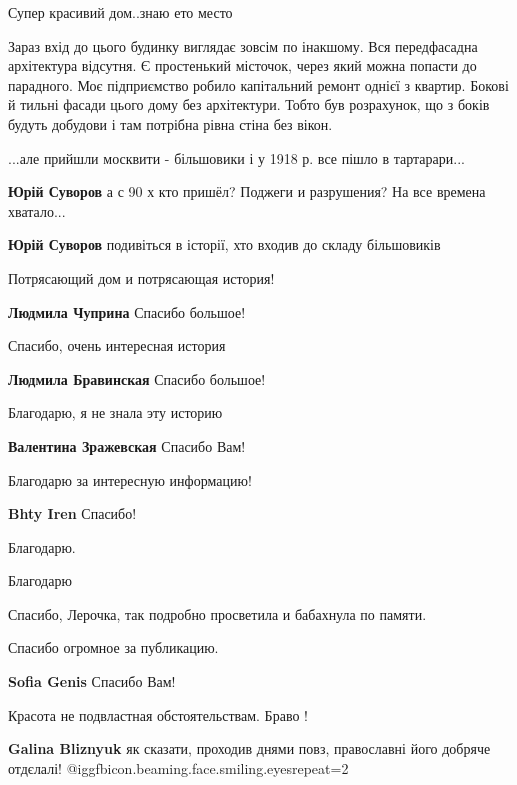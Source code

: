 \begin{itemize}
Супер красивий дом..знаю ето место


Зараз вхід до цього будинку виглядає зовсім по інакшому. Вся передфасадна
архітектура відсутня. Є простенький місточок, через який можна попасти до
парадного. Моє підприємство робило капітальний ремонт однієї з квартир. Бокові
й тильні фасади цього дому без архітектури. Тобто був розрахунок, що з боків
будуть добудови і там потрібна рівна стіна без вікон.

...але прийшли москвити - більшовики і у 1918 р. все пішло в тартарари...

\begin{itemize} %
\textbf{Юрій Суворов} а с 90 х кто пришёл? Поджеги и разрушения? На все времена хватало...

\textbf{Юрій Суворов} подивіться в історії, хто входив до складу більшовиків
\end{itemize} %

Потрясающий дом и потрясающая история!

\textbf{Людмила Чуприна} Спасибо большое!

Спасибо, очень интересная история

\textbf{Людмила Бравинская} Спасибо большое!

Благодарю, я не знала эту историю

\textbf{Валентина Зражевская} Спасибо Вам!

Благодарю за интересную информацию!

\textbf{Bhty Iren} Спасибо!

Благодарю.

Благодарю

Спасибо, Лерочка, так подробно просветила и бабахнула по памяти.

Спасибо огромное за публикацию.

\textbf{Sofia Genis} Спасибо Вам!

Красота не подвластная обстоятельствам.
Браво !

\textbf{Galina Bliznyuk} як сказати, проходив днями повз, православні його добряче отдєлалі!  @igg{fbicon.beaming.face.smiling.eyes}{repeat=2} 


\end{itemize}

